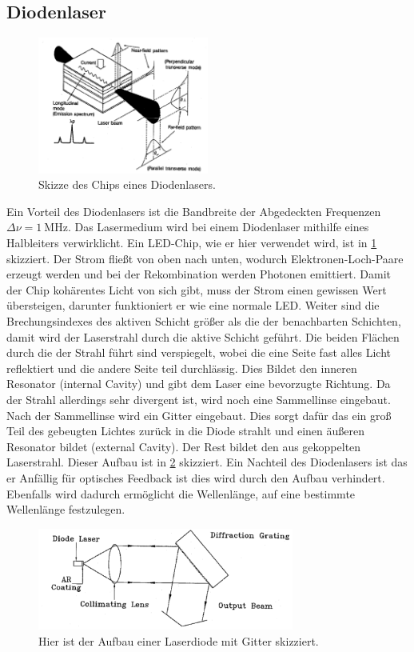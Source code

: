 \subsection{Diodenlaser}
\begin{figure}[h!]
	\centering
	\includegraphics[width = 0.5\textwidth]{../Grafiken/Schematische_Ansicht_Laserdiode.pdf}
	\caption{Skizze des Chips eines Diodenlasers.\cite{V60}\label{fig:Halleiter-Chip}}
\end{figure}
Ein Vorteil des Diodenlasers ist die Bandbreite der Abgedeckten Frequenzen $\Delta \nu = \SI{1}{\mega\hertz}$.
Das Lasermedium wird bei einem Diodenlaser mithilfe eines Halbleiters verwirklicht.
Ein LED-Chip, wie er hier verwendet wird, ist in \cref{fig:Halleiter-Chip} skizziert.
Der Strom fließt von oben nach unten, wodurch Elektronen-Loch-Paare erzeugt werden und bei der Rekombination werden Photonen emittiert.
Damit der Chip kohärentes Licht von sich gibt, muss der Strom einen gewissen Wert übersteigen, darunter funktioniert er wie eine normale LED.
Weiter sind die Brechungsindexes des aktiven Schicht größer als die der benachbarten Schichten, damit wird der Laserstrahl durch die aktive Schicht geführt.
Die beiden Flächen durch die der Strahl führt sind verspiegelt, wobei die eine Seite fast alles Licht reflektiert und die andere Seite teil durchlässig.
Dies Bildet den inneren Resonator (internal Cavity) und gibt dem Laser eine bevorzugte Richtung.
Da der Strahl allerdings sehr divergent ist, wird noch eine Sammellinse eingebaut.
Nach der Sammellinse wird ein Gitter eingebaut.
Dies sorgt dafür das ein groß Teil des gebeugten Lichtes zurück in die Diode strahlt und einen äußeren Resonator bildet (external Cavity).
Der Rest bildet den aus gekoppelten Laserstrahl.
Dieser Aufbau ist in \cref{fig:Aufbau_Gitter_Laserdiode} skizziert.
Ein Nachteil des Diodenlasers ist das er Anfällig für optisches Feedback ist dies wird durch den Aufbau verhindert.
Ebenfalls wird dadurch ermöglicht die Wellenlänge, auf eine bestimmte Wellenlänge festzulegen.
\begin{figure}
	\centering
	\includegraphics[width = 0.75\textwidth]{../Grafiken/Aufbau_Gitter_Laserdiode.pdf}
	\caption{Hier ist der Aufbau einer Laserdiode mit Gitter skizziert.\cite{V60}\label{fig:Aufbau_Gitter_Laserdiode}}
\end{figure}
\newpage
